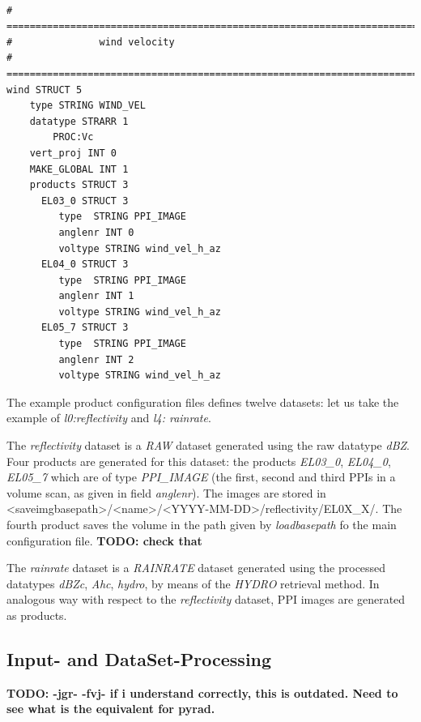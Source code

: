 \documentclass[a4paper,11pt,pdftex,twoside]{scrartcl}
\renewcommand{\bf}{\normalfont \bfseries}
\begin{document}
{{{\begin{verbatim}
			
# ==========================================================================================
#               wind velocity
# ==========================================================================================
wind STRUCT 5
    type STRING WIND_VEL
    datatype STRARR 1
        PROC:Vc
    vert_proj INT 0
    MAKE_GLOBAL INT 1
    products STRUCT 3      
      EL03_0 STRUCT 3
         type  STRING PPI_IMAGE
         anglenr INT 0
         voltype STRING wind_vel_h_az
      EL04_0 STRUCT 3
         type  STRING PPI_IMAGE
         anglenr INT 1
         voltype STRING wind_vel_h_az
      EL05_7 STRUCT 3
         type  STRING PPI_IMAGE
         anglenr INT 2
         voltype STRING wind_vel_h_az
\end{verbatim}

The example product configuration files defines twelve datasets: let us take the example of \emph{l0:reflectivity}
and \emph{l4: rainrate}.

The \emph{reflectivity} dataset is a \emph{RAW} dataset generated using the raw
datatype \emph{dBZ}. Four products are generated for this dataset: the products
\emph{EL03\_0}, \emph{EL04\_0}, \emph{EL05\_7} which are of type \emph{PPI\_IMAGE} (the first, second and third PPIs in a volume scan, as given in field \emph{anglenr}). The images are stored in
<saveimgbasepath>/<name>/<YYYY-MM-DD>/reflectivity/EL0X\_X/. The fourth product saves the volume in the path given by \emph{loadbasepath} fo the main configuration file. {\bf TODO: check that}

The \emph{rainrate} dataset is a \emph{RAINRATE} dataset generated using the processed
datatypes \emph{dBZc}, \emph{Ahc}, \emph{hydro}, by means of the \emph{HYDRO} retrieval method.
In analogous way with respect to the \emph{reflectivity} dataset, PPI images are generated as products.

\subsection{Input- and DataSet-Processing}
\label{subsec_general_processing}

{\bf TODO: -jgr- -fvj- if i understand correctly, this is outdated. Need to see what is the equivalent for pyrad. }


}}}
\end{document}
